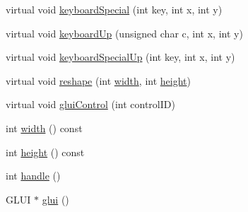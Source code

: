 \begin{DoxyCompactItemize}
\item 
virtual void \hyperlink{classBaseGfxApp_a345566e62c9e4ec3705ec4d1c4c75f1f}{keyboard\-Special} (int key, int x, int y)
\item 
virtual void \hyperlink{classBaseGfxApp_acc4a40ce11edd6b6660a19cb4802a2bf}{keyboard\-Up} (unsigned char c, int x, int y)
\item 
virtual void \hyperlink{classBaseGfxApp_afd14b435ff93b1e7f461cb8bd1a6fd59}{keyboard\-Special\-Up} (int key, int x, int y)
\item 
virtual void \hyperlink{classBaseGfxApp_a5d8d5d778a8aecd7f5f8e9c87f4c3d20}{reshape} (int \hyperlink{classBaseGfxApp_ace089a1a94fb6bb0bc17e1b7fa48e05d}{width}, int \hyperlink{classBaseGfxApp_aa253dbe16a20c40e0a1bf8ff942ceea3}{height})
\item 
virtual void \hyperlink{classBaseGfxApp_a2978a7c358794c67df73b66776b2cef3}{glui\-Control} (int control\-I\-D)
\item 
int \hyperlink{classBaseGfxApp_ace089a1a94fb6bb0bc17e1b7fa48e05d}{width} () const 
\item 
int \hyperlink{classBaseGfxApp_aa253dbe16a20c40e0a1bf8ff942ceea3}{height} () const 
\item 
int \hyperlink{classBaseGfxApp_ae9779f948eff6f45beec08091e98a803}{handle} ()
\item 
G\-L\-U\-I $\ast$ \hyperlink{classBaseGfxApp_ac721a0fedce80308c5c0e5695016e95d}{glui} ()
\end{DoxyCompactItemize}
